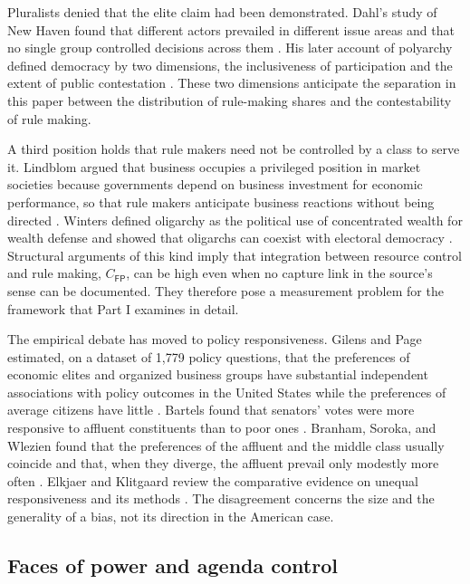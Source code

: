 \documentclass[11pt,letterpaper]{article}
\theoremstyle{definition}
\theoremstyle{remark}
\newcommand{\pF}{\mathsf{F}}
\newcommand{\pP}{\mathsf{P}}
\begin{document}
Pluralists denied that the elite claim had been demonstrated. Dahl's study of New Haven found that different actors prevailed in different issue areas and that no single group controlled decisions across them \citep{dahl1961}. His later account of polyarchy defined democracy by two dimensions, the inclusiveness of participation and the extent of public contestation \citep{dahl1971}. These two dimensions anticipate the separation in this paper between the distribution of rule-making shares and the contestability of rule making.

A third position holds that rule makers need not be controlled by a class to serve it. Lindblom argued that business occupies a privileged position in market societies because governments depend on business investment for economic performance, so that rule makers anticipate business reactions without being directed \citep{lindblom1977}. Winters defined oligarchy as the political use of concentrated wealth for wealth defense and showed that oligarchs can coexist with electoral democracy \citep{winters2011}. Structural arguments of this kind imply that integration between resource control and rule making, $C_{\pF\pP}$, can be high even when no capture link in the source's sense can be documented. They therefore pose a measurement problem for the framework that Part I examines in detail.

The empirical debate has moved to policy responsiveness. Gilens and Page estimated, on a dataset of 1,779 policy questions, that the preferences of economic elites and organized business groups have substantial independent associations with policy outcomes in the United States while the preferences of average citizens have little \citep{gilens2014}. Bartels found that senators' votes were more responsive to affluent constituents than to poor ones \citep{bartels2008}. Branham, Soroka, and Wlezien found that the preferences of the affluent and the middle class usually coincide and that, when they diverge, the affluent prevail only modestly more often \citep{branham2017}. Elkjaer and Klitgaard review the comparative evidence on unequal responsiveness and its methods \citep{elkjaer2024}. The disagreement concerns the size and the generality of a bias, not its direction in the American case.

\subsection{Faces of power and agenda control}
\end{document}
